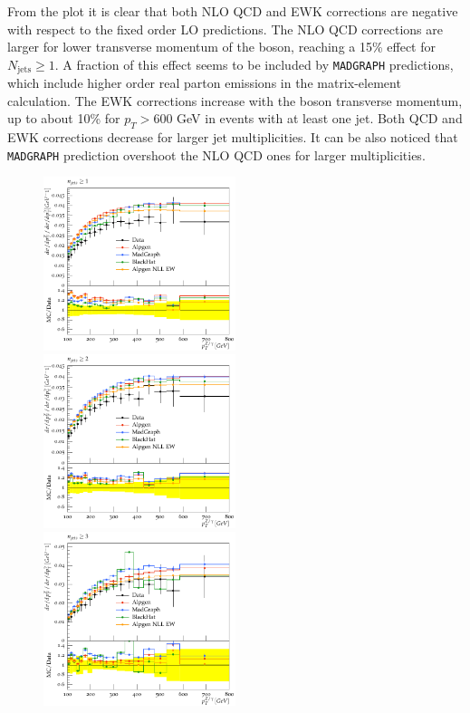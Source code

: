 \documentclass[11pt]{cernrep} \usepackage{graphicx,epsfig} 
\begin{document}
From the plot it is clear that both NLO QCD and EWK corrections are negative with respect to the fixed order LO
predictions. The NLO QCD corrections are larger for lower transverse momentum of the boson, reaching a 15\% effect for
$N_{\mathrm{jets}} \geq 1$. A fraction of this effect seems to be included by {\tt MADGRAPH} predictions, which include higher order
real parton emissions in the matrix-element calculation. The EWK corrections increase with the boson transverse
momentum, up to about 10\% for $p_T > 600$ GeV in events with at least one jet. Both QCD and EWK corrections decrease
for larger jet multiplicities. It can be also noticed that {\tt MADGRAPH} prediction overshoot the NLO QCD ones for
larger multiplicities. 

\begin{figure}
\begin{center}
\includegraphics[width=0.5\textwidth]{d07-x01-y01.pdf} \\
\includegraphics[width=0.5\textwidth]{d08-x01-y01.pdf} \\
\includegraphics[width=0.5\textwidth]{d08-x02-y01.pdf}

\end{center}
\end{figure}
\end{document}
